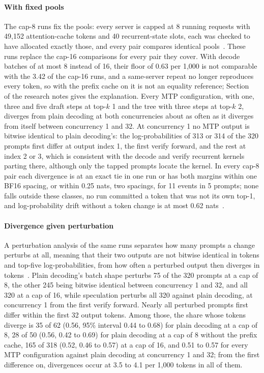 \paragraph{With fixed pools} The cap-8 runs fix the pools: every server is capped at 8 running requests with 49,152 attention-cache tokens and 40 recurrent-state slots, each was checked to have allocated exactly those, and every pair compares identical pools~. These runs replace the cap-16 comparisons for every pair they cover. With decode batches of at most 8 instead of 16, their floor of 0.63 per 1,000 is not comparable with the 3.42 of the cap-16 runs, and a same-server repeat no longer reproduces every token, so with the prefix cache on it is not an equality reference; Section~ of the research notes gives the explanation. Every MTP configuration, with one, three and five draft steps at top-$k$ 1 and the tree with three steps at top-$k$ 2, diverges from plain decoding at both concurrencies about as often as it diverges from itself between concurrency 1 and 32. At concurrency 1 no MTP output is bitwise identical to plain decoding's: the log-probabilities of 313 or 314 of the 320 prompts first differ at output index 1, the first verify forward, and the rest at index 2 or 3, which is consistent with the decode and verify recurrent kernels parting there, although only the tapped prompts locate the kernel. In every cap-8 pair each divergence is at an exact tie in one run or has both margins within one BF16 spacing, or within 0.25 nats, two spacings, for 11 events in 5 prompts; none falls outside these classes, no run committed a token that was not its own top-1, and log-probability drift without a token change is at most 0.62 nats~.

\paragraph{Divergence given perturbation} A perturbation analysis of the same runs separates how many prompts a change perturbs at all, meaning that their two outputs are not bitwise identical in tokens and top-five log-probabilities, from how often a perturbed output then diverges in tokens~. Plain decoding's batch shape perturbs 75 of the 320 prompts at a cap of 8, the other 245 being bitwise identical between concurrency 1 and 32, and all 320 at a cap of 16, while speculation perturbs all 320 against plain decoding, at concurrency 1 from the first verify forward. Nearly all perturbed prompts first differ within the first 32 output tokens. Among those, the share whose tokens diverge is 35 of 62 (0.56, 95\% interval 0.44 to 0.68) for plain decoding at a cap of 8, 28 of 50 (0.56, 0.42 to 0.69) for plain decoding at a cap of 8 without the prefix cache, 165 of 318 (0.52, 0.46 to 0.57) at a cap of 16, and 0.51 to 0.57 for every MTP configuration against plain decoding at concurrency 1 and 32; from the first difference on, divergences occur at 3.5 to 4.1 per 1,000 tokens in all of them.

